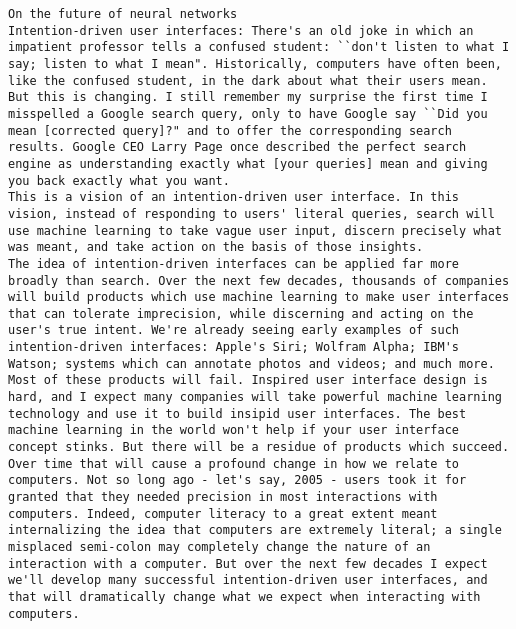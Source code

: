 \begin{lstlisting}
On the future of neural networks
Intention-driven user interfaces: There's an old joke in which an impatient professor tells a confused student: ``don't listen to what I say; listen to what I mean". Historically, computers have often been, like the confused student, in the dark about what their users mean. But this is changing. I still remember my surprise the first time I misspelled a Google search query, only to have Google say ``Did you mean [corrected query]?" and to offer the corresponding search results. Google CEO Larry Page once described the perfect search engine as understanding exactly what [your queries] mean and giving you back exactly what you want.
This is a vision of an intention-driven user interface. In this vision, instead of responding to users' literal queries, search will use machine learning to take vague user input, discern precisely what was meant, and take action on the basis of those insights.
The idea of intention-driven interfaces can be applied far more broadly than search. Over the next few decades, thousands of companies will build products which use machine learning to make user interfaces that can tolerate imprecision, while discerning and acting on the user's true intent. We're already seeing early examples of such intention-driven interfaces: Apple's Siri; Wolfram Alpha; IBM's Watson; systems which can annotate photos and videos; and much more.
Most of these products will fail. Inspired user interface design is hard, and I expect many companies will take powerful machine learning technology and use it to build insipid user interfaces. The best machine learning in the world won't help if your user interface concept stinks. But there will be a residue of products which succeed. Over time that will cause a profound change in how we relate to computers. Not so long ago - let's say, 2005 - users took it for granted that they needed precision in most interactions with computers. Indeed, computer literacy to a great extent meant internalizing the idea that computers are extremely literal; a single misplaced semi-colon may completely change the nature of an interaction with a computer. But over the next few decades I expect we'll develop many successful intention-driven user interfaces, and that will dramatically change what we expect when interacting with computers.

\end{lstlisting}
